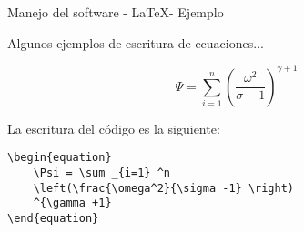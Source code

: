 \begin{frame}[fragile]{Manejo del software - \LaTeX - Ejemplo}\vspace{0pt}

Algunos ejemplos de escritura de ecuaciones...

\begin{equation}
	\Psi = \sum _{i=1} ^n \left(\frac{\omega^2}{\sigma -1} \right) ^{\gamma +1}
\end{equation}

La escritura del c\'odigo es la siguiente:

\begin{center}
\begin{lstlisting}
\begin{equation}
	\Psi = \sum _{i=1} ^n 
	\left(\frac{\omega^2}{\sigma -1} \right) 
	^{\gamma +1}
\end{equation}
\end{lstlisting}
\end{center}

\end{frame}